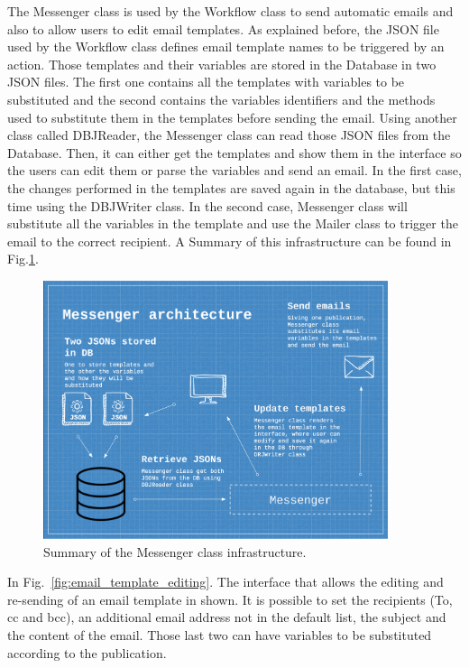 The Messenger class is used by the Workflow class to send automatic emails and also to allow users to edit email templates. As explained before, the JSON file used by the Workflow class defines email template names to be triggered by an action. Those templates and their variables are stored in the Database in two JSON files. The first one contains all the templates with variables to be substituted and the second contains the variables identifiers and the methods used to substitute them in the templates before sending the email.
Using another class called DBJReader, the Messenger class can read those JSON files from the Database. Then, it can either get the templates and show them in the interface so the users can edit them or parse the variables and send an email. In the first case, the changes performed in the templates are saved again in the database, but this time using the DBJWriter class. In the second case, Messenger class will substitute all the variables in the template and use the Mailer class to trigger the email to the correct recipient. A Summary of this infrastructure can be found in Fig.\ref{fig:Messenger_class}. 
\begin{figure}[ht!]
  \centering
  \includegraphics[width=0.9\textwidth]{figures/Messenger_class.png}
  \caption{Summary of the Messenger class infrastructure.}
  \label{fig:Messenger_class}
\end{figure}
In Fig.~\ref{fig:email_template_editing}. The interface that allows the editing and re-sending of an email template in shown. It is possible to set the recipients (To, cc and bcc), an additional email address not in the default list, the subject and the content of the email. Those last two can have variables to be substituted according to the publication. 
